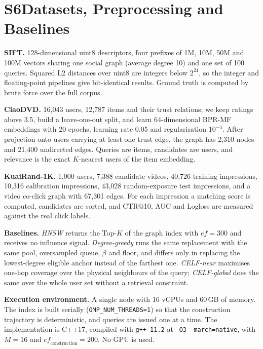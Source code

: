 \documentclass[conference]{IEEEtran}
\begin{document}
\section*{S6\quad Datasets, Preprocessing and Baselines}
\label{sec:s6}

\textbf{SIFT.} 128-dimensional uint8 descriptors, four prefixes of 1M, 10M, 50M
and 100M vectors sharing one social graph (average degree 10) and one set of 100
queries. Squared L2 distances over uint8 are integers below $2^{24}$, so the
integer and floating-point pipelines give bit-identical results. Ground truth is
computed by brute force over the full corpus.

\textbf{CiaoDVD.} 16{,}043 users, 12{,}787 items and their trust relations; we
keep ratings above 3.5, build a leave-one-out split, and learn 64-dimensional
BPR-MF embeddings with 20 epochs, learning rate 0.05 and regularisation
$10^{-4}$. After projection onto users carrying at least one trust edge, the
graph has 2{,}310 nodes and 21{,}400 undirected edges. Queries are items,
candidates are users, and relevance is the exact $K$-nearest users of the item
embedding.

\textbf{KuaiRand-1K.} 1{,}000 users, 7{,}388 candidate videos, 40{,}726
training impressions, 10{,}316 calibration impressions, 43{,}028 random-exposure
test impressions, and a video co-click graph with 67{,}301 edges. For each
impression a matching score is computed, candidates are sorted, and CTR@10, AUC
and Logloss are measured against the real click labels.

\textbf{Baselines.} \emph{HNSW} returns the Top-$K$ of the graph index with
$\mathit{ef}{=}300$ and receives no influence signal. \emph{Degree-greedy}
runs the same replacement with the same pool, oversampled queue, $\beta$ and
floor, and differs only in replacing the lowest-degree eligible anchor instead
of the farthest one. \emph{CELF-near} maximises one-hop coverage over the
physical neighbours of the query; \emph{CELF-global} does the same over the whole
user set without a retrieval constraint.

\textbf{Execution environment.} A single node with 16 vCPUs and 60\,GB of memory.
The index is built serially (\texttt{OMP\_NUM\_THREADS=1}) so that the
construction trajectory is deterministic, and queries are issued one at a time.
The implementation is C++17, compiled with \texttt{g++ 11.2} at
\texttt{-O3 -march=native}, with $M{=}16$ and
$\mathit{ef}_{\text{construction}}{=}200$. No GPU is used.
\end{document}
